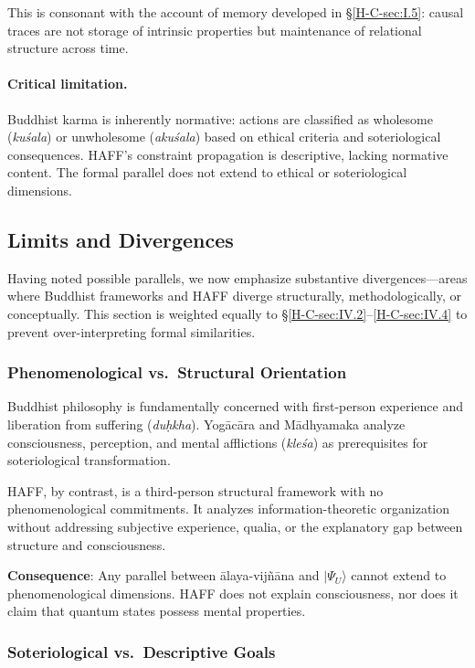 \documentclass[12pt,a4paper,openany]{book}
\begin{document}
This is consonant with the account of memory developed in §\ref{H-C-sec:I.5}: causal traces are not storage of intrinsic properties but maintenance of relational structure across time.

\paragraph{Critical limitation.}
Buddhist karma is inherently normative: actions are classified as wholesome (\emph{kuśala}) or unwholesome (\emph{akuśala}) based on ethical criteria and soteriological consequences. HAFF's constraint propagation is descriptive, lacking normative content. The formal parallel does not extend to ethical or soteriological dimensions.

\subsection{Limits and Divergences}
\label{H-C-sec:IV.5}

Having noted possible parallels, we now emphasize substantive divergences—areas where Buddhist frameworks and HAFF diverge structurally, methodologically, or conceptually. This section is weighted equally to §\ref{H-C-sec:IV.2}--\ref{H-C-sec:IV.4} to prevent over-interpreting formal similarities.

\subsubsection{Phenomenological vs.\ Structural Orientation}

Buddhist philosophy is fundamentally concerned with first-person experience and liberation from suffering (\emph{du\d{h}kha}). Yog\=ac\=ara and M\=adhyamaka analyze consciousness, perception, and mental afflictions (\emph{kleśa}) as prerequisites for soteriological transformation.

HAFF, by contrast, is a third-person structural framework with no phenomenological commitments. It analyzes information-theoretic organization without addressing subjective experience, qualia, or the explanatory gap between structure and consciousness.

\textbf{Consequence}: Any parallel between \=alaya-vijñ\=ana and $|\Psi_U\rangle$ cannot extend to phenomenological dimensions. HAFF does not explain consciousness, nor does it claim that quantum states possess mental properties.

\subsubsection{Soteriological vs.\ Descriptive Goals}
\end{document}
